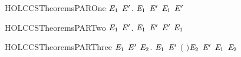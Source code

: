 \newcommand{\HOLCCSTheoremsNOTINXXFVXXlemma}{\UseVerbatim{HOLCCSTheoremsNOTINXXFVXXlemma}}
\begin{SaveVerbatim}{HOLCCSTheoremsPAROne}
\HOLTokenTurnstile{} \HOLSymConst{\HOLTokenForall{}}  \ensuremath{\HOLBoundVar{E}\sb{\mathrm{1}}} \ensuremath{\HOLBoundVar{E}\sp{\prime{}}}.  \HOLTokenTransBegin{}\HOLTokenTransEnd \ensuremath{\HOLBoundVar{E}\sb{\mathrm{1}}} \HOLSymConst{\HOLTokenImp{}}  \HOLSymConst{\ensuremath{\mid}} \ensuremath{\HOLBoundVar{E}\sp{\prime{}}} \HOLTokenTransBegin{}\HOLTokenTransEnd \ensuremath{\HOLBoundVar{E}\sb{\mathrm{1}}} \HOLSymConst{\ensuremath{\mid}} \ensuremath{\HOLBoundVar{E}\sp{\prime{}}}
\end{SaveVerbatim}
\newcommand{\HOLCCSTheoremsPAROne}{\UseVerbatim{HOLCCSTheoremsPAROne}}
\begin{SaveVerbatim}{HOLCCSTheoremsPARTwo}
\HOLTokenTurnstile{} \HOLSymConst{\HOLTokenForall{}}  \ensuremath{\HOLBoundVar{E}\sb{\mathrm{1}}} \ensuremath{\HOLBoundVar{E}\sp{\prime{}}}.  \HOLTokenTransBegin{}\HOLTokenTransEnd \ensuremath{\HOLBoundVar{E}\sb{\mathrm{1}}} \HOLSymConst{\HOLTokenImp{}} \ensuremath{\HOLBoundVar{E}\sp{\prime{}}} \HOLSymConst{\ensuremath{\mid}}  \HOLTokenTransBegin{}\HOLTokenTransEnd \ensuremath{\HOLBoundVar{E}\sp{\prime{}}} \HOLSymConst{\ensuremath{\mid}} \ensuremath{\HOLBoundVar{E}\sb{\mathrm{1}}}
\end{SaveVerbatim}
\newcommand{\HOLCCSTheoremsPARTwo}{\UseVerbatim{HOLCCSTheoremsPARTwo}}
\begin{SaveVerbatim}{HOLCCSTheoremsPARThree}
\HOLTokenTurnstile{} \HOLSymConst{\HOLTokenForall{}}  \ensuremath{\HOLBoundVar{E}\sb{\mathrm{1}}} \ensuremath{\HOLBoundVar{E}\sp{\prime{}}} \ensuremath{\HOLBoundVar{E}\sb{\mathrm{2}}}.
      \HOLTokenTransBegin{} \HOLTokenTransEnd \ensuremath{\HOLBoundVar{E}\sb{\mathrm{1}}} \HOLSymConst{\HOLTokenConj{}} \ensuremath{\HOLBoundVar{E}\sp{\prime{}}} \HOLTokenTransBegin{} \ensuremath{(} \ensuremath{)}\HOLTokenTransEnd \ensuremath{\HOLBoundVar{E}\sb{\mathrm{2}}} \HOLSymConst{\HOLTokenImp{}}
      \HOLSymConst{\ensuremath{\mid}} \ensuremath{\HOLBoundVar{E}\sp{\prime{}}} \HOLTokenTransBegin\HOLConst{\ensuremath{\tau}}\HOLTokenTransEnd \ensuremath{\HOLBoundVar{E}\sb{\mathrm{1}}} \HOLSymConst{\ensuremath{\mid}} \ensuremath{\HOLBoundVar{E}\sb{\mathrm{2}}}
\end{SaveVerbatim}

